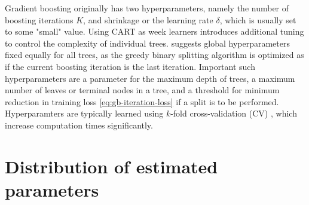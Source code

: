 Gradient boosting originally has two hyperparameters, namely the number of boosting iterations $K$, and shrinkage or the learning rate $\delta$, which is usually set to some "small" value.
Using CART as week learners introduces additional tuning to control the complexity of individual trees.
\citet{friedman2000additive} suggests global hyperparameters fixed equally for all trees, as the greedy binary splitting algorithm is optimized as if the current boosting iteration is the last iteration.
Important such hyperparameters are a parameter for the maximum depth of trees, a maximum number of leaves or terminal nodes in a tree, and a threshold for minimum reduction in training loss \eqref{eq:gb-iteration-loss} if a split is to be performed.
Hyperparamters are typically learned using $k$-fold cross-validation (CV) \citep{stone1974cross}, which increase computation times significantly.





%
%
%
%
%
%
%
%
%
%
%
%


\section{Distribution of estimated parameters}
\label{sec:distribution of estimated parameters}

